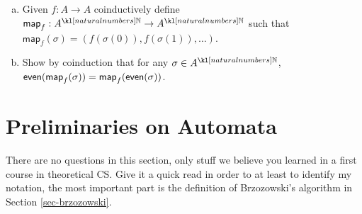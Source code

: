 \documentclass[main.tex]{subfiles}
\begin{document}
\begin{exer}[3pts]
    \begin{enumerate}[(a)]
        \item Given $f:A \rightarrow A$ coinductively define $\textsf{map}_f: A^{\N} \rightarrow A^{\N}$ such that $\textsf{map}_f(\sigma) = (f(\sigma(0)), f(\sigma(1)), \dots)$.
        \item Show by coinduction that for any $\sigma \in A^{\N}$, $\textsf{even}(\textsf{map}_f(\sigma)) = \textsf{map}_{f}(\textsf{even}(\sigma))$.
    \end{enumerate}
\end{exer}


\section{Preliminaries on Automata}
There are no questions in this section, only stuff we believe you learned in a first course in theoretical CS. Give it a quick read in order to at least to identify my notation, the most important part is the definition of Brzozowski's algorithm in Section \ref{sec-brzozowski}.
\end{document}
